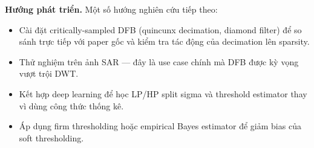 \textbf{Hướng phát triển.}
Một số hướng nghiên cứu tiếp theo:
\begin{itemize}
    \item Cài đặt critically-sampled DFB (quincunx decimation, diamond filter) để so sánh trực tiếp với paper gốc và kiểm tra tác động của decimation lên sparsity.
    \item Thử nghiệm trên ảnh SAR --- đây là use case chính mà DFB được kỳ vọng vượt trội DWT.
    \item Kết hợp deep learning để học LP/HP split sigma và threshold estimator thay vì dùng công thức thống kê.
    \item Áp dụng firm thresholding hoặc empirical Bayes estimator để giảm bias của soft thresholding.
\end{itemize}
